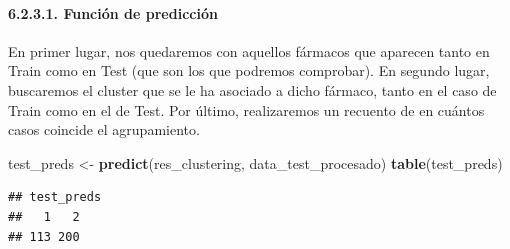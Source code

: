 \documentclass[spanish,]{article}
\newenvironment{Shaded}{\begin{snugshade}}{\end{snugshade}}
\newcommand{\KeywordTok}[1]{\textcolor[rgb]{0.13,0.29,0.53}{\textbf{#1}}}
\newcommand{\StringTok}[1]{\textcolor[rgb]{0.31,0.60,0.02}{#1}}
\newcommand{\NormalTok}[1]{#1}
\let\oldparagraph\paragraph
\renewcommand{\paragraph}[1]{\oldparagraph{#1}\mbox{}}
\begin{document}
\paragraph{6.2.3.1. Función de predicción}\label{funcion-de-prediccion}

En primer lugar, nos quedaremos con aquellos fármacos que aparecen tanto
en Train como en Test (que son los que podremos comprobar). En segundo
lugar, buscaremos el cluster que se le ha asociado a dicho fármaco,
tanto en el caso de Train como en el de Test. Por último, realizaremos
un recuento de en cuántos casos coincide el agrupamiento.

\begin{Shaded}
\begin{Highlighting}[]
\NormalTok{test_preds <-}\StringTok{ }\KeywordTok{predict}\NormalTok{(res_clustering, data_test_procesado)}
\KeywordTok{table}\NormalTok{(test_preds)}
\end{Highlighting}
\end{Shaded}

\begin{verbatim}
## test_preds
##   1   2 
## 113 200
\end{verbatim}
\end{document}
